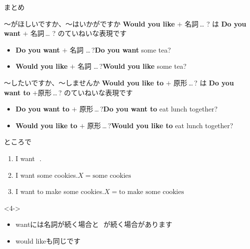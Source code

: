 \documentclass[aspectratio=169,xcolor={dvipsnames,table}]{beamer}
\begin{document}
\begin{frame}[plain]{まとめ}
\begin{block}{～がほしいですか、～はいかがですか}\small
\textbf{Would you like} $+$ 名詞\,\ldots\,\,?\,\,は\,\,\textbf{Do you want} $+$ 名詞\,\ldots\,\,?\,\,のていねいな表現です
\begin{itemize}[square]\small
 \item \textbf{Do you want} $+$ 名詞 \ldots\,?\hfill{\scriptsize \textbf{Do you want} some tea?}
 \item \textbf{Would you like} $+$ 名詞 \ldots\,?\hfill{\scriptsize \textbf{Would you like} some tea?}
       \end{itemize}
\end{block}

\begin{block}{～したいですか、～しませんか}\small
\textbf{Would you like to} $+$ 原形\,\ldots\,?\,\,は\,\,\textbf{Do you want to} $+$原形\,\ldots\,?\,\,のていねいな表現です
\begin{itemize}[square]\small
 \item \textbf{Do you want to} $+$ 原形\,\ldots\,?\hfill{\scriptsize \textbf{Do you want to} eat lunch together?}
 \item \textbf{Would you like to} $+$ 原形\,\ldots\,?\hfill{\scriptsize \textbf{Would you like to} eat lunch together?}
       \end{itemize}
\end{block}
\end{frame}
\begin{frame}[plain]{ところで}
 \begin{enumerate}
  \item<1-> I want \,\,.
  \item<2-> I want some cookies.\hfill{\scriptsize $X = \text{some cookies}$}
  \item<3-> I want to make some cookies.\hfill{\scriptsize $X = \text{to make some cookies}$}
 \end{enumerate}

\vfill

\begin{block}<4->{}
 
\textdbend \textdbend
\begin{itemize}[square]\small
 \item wantには名詞が続く場合と\,\,\,\,が続く場合があります
 \item would likeも同じです
\end{itemize}
\end{block}
\end{frame}
\end{document}

